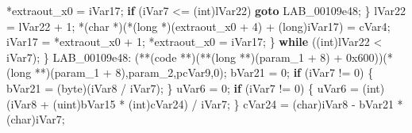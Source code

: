 \documentclass[
]{article}
\newenvironment{Shaded}{}{}
\newcommand{\BaseNTok}[1]{\textcolor[rgb]{0.25,0.63,0.44}{#1}}
\newcommand{\ControlFlowTok}[1]{\textcolor[rgb]{0.00,0.44,0.13}{\textbf{#1}}}
\newcommand{\DataTypeTok}[1]{\textcolor[rgb]{0.56,0.13,0.00}{#1}}
\newcommand{\DecValTok}[1]{\textcolor[rgb]{0.25,0.63,0.44}{#1}}
\newcommand{\ExtensionTok}[1]{#1}
\newcommand{\NormalTok}[1]{#1}
\newcommand{\OperatorTok}[1]{\textcolor[rgb]{0.40,0.40,0.40}{#1}}
\begin{document}
\begin{Shaded}
\begin{Highlighting}[]
        \OperatorTok{*}\NormalTok{extraout\_x0 }\OperatorTok{=}\NormalTok{ iVar17}\OperatorTok{;}
        \ControlFlowTok{if} \OperatorTok{(}\NormalTok{iVar7 }\OperatorTok{\textless{}=} \OperatorTok{(}\DataTypeTok{int}\OperatorTok{)}\NormalTok{lVar22}\OperatorTok{)} \ControlFlowTok{goto}\NormalTok{ LAB\_00109e48}\OperatorTok{;}
      \OperatorTok{\}}
\NormalTok{      lVar22 }\OperatorTok{=}\NormalTok{ lVar22 }\OperatorTok{+} \DecValTok{1}\OperatorTok{;}
      \OperatorTok{*(}\DataTypeTok{char} \OperatorTok{*)(*(}\DataTypeTok{long} \OperatorTok{*)(}\NormalTok{extraout\_x0 }\OperatorTok{+} \DecValTok{4}\OperatorTok{)} \OperatorTok{+} \OperatorTok{(}\DataTypeTok{long}\OperatorTok{)}\NormalTok{iVar17}\OperatorTok{)} \OperatorTok{=}\NormalTok{ cVar4}\OperatorTok{;}
\NormalTok{      iVar17 }\OperatorTok{=} \OperatorTok{*}\NormalTok{extraout\_x0 }\OperatorTok{+} \DecValTok{1}\OperatorTok{;}
      \OperatorTok{*}\NormalTok{extraout\_x0 }\OperatorTok{=}\NormalTok{ iVar17}\OperatorTok{;}
    \OperatorTok{\}} \ControlFlowTok{while} \OperatorTok{((}\DataTypeTok{int}\OperatorTok{)}\NormalTok{lVar22 }\OperatorTok{\textless{}}\NormalTok{ iVar7}\OperatorTok{);}
  \OperatorTok{\}}
\NormalTok{LAB\_00109e48}\OperatorTok{:}
  \OperatorTok{(**(}\NormalTok{code }\OperatorTok{**)(**(}\DataTypeTok{long} \OperatorTok{**)(}\NormalTok{param\_1 }\OperatorTok{+} \DecValTok{8}\OperatorTok{)} \OperatorTok{+} \BaseNTok{0x600}\OperatorTok{))(*(}\DataTypeTok{long} \OperatorTok{**)(}\NormalTok{param\_1 }\OperatorTok{+} \DecValTok{8}\OperatorTok{),}\NormalTok{param\_2}\OperatorTok{,}\NormalTok{pcVar9}\OperatorTok{,}\DecValTok{0}\OperatorTok{);}
\NormalTok{  bVar21 }\OperatorTok{=} \DecValTok{0}\OperatorTok{;}
  \ControlFlowTok{if} \OperatorTok{(}\NormalTok{iVar7 }\OperatorTok{!=} \DecValTok{0}\OperatorTok{)} \OperatorTok{\{}
\NormalTok{    bVar21 }\OperatorTok{=} \OperatorTok{(}\NormalTok{byte}\OperatorTok{)(}\NormalTok{iVar8 }\OperatorTok{/}\NormalTok{ iVar7}\OperatorTok{);}
  \OperatorTok{\}}
\NormalTok{  uVar6 }\OperatorTok{=} \DecValTok{0}\OperatorTok{;}
  \ControlFlowTok{if} \OperatorTok{(}\NormalTok{iVar7 }\OperatorTok{!=} \DecValTok{0}\OperatorTok{)} \OperatorTok{\{}
\NormalTok{    uVar6 }\OperatorTok{=} \OperatorTok{(}\DataTypeTok{int}\OperatorTok{)(}\NormalTok{iVar8 }\OperatorTok{+} \OperatorTok{(}\ExtensionTok{uint}\OperatorTok{)}\NormalTok{bVar15 }\OperatorTok{*} \OperatorTok{(}\DataTypeTok{int}\OperatorTok{)}\NormalTok{cVar24}\OperatorTok{)} \OperatorTok{/}\NormalTok{ iVar7}\OperatorTok{;}
  \OperatorTok{\}}
\NormalTok{  cVar24 }\OperatorTok{=} \OperatorTok{(}\DataTypeTok{char}\OperatorTok{)}\NormalTok{iVar8 }\OperatorTok{{-}}\NormalTok{ bVar21 }\OperatorTok{*} \OperatorTok{(}\DataTypeTok{char}\OperatorTok{)}\NormalTok{iVar7}\OperatorTok{;}

\end{Highlighting}
\end{Shaded}
\end{document}
